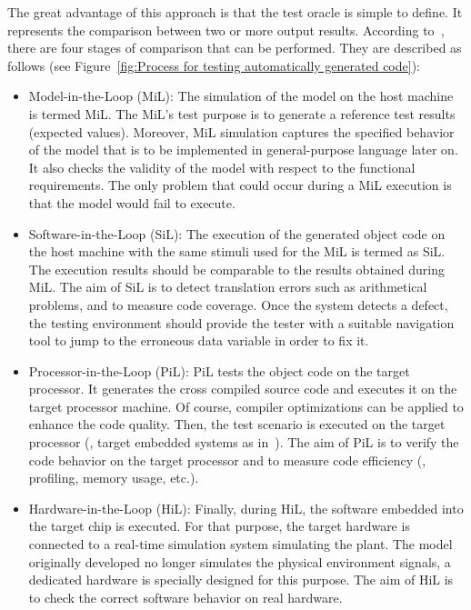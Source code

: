 The great advantage of this approach is that the test oracle is simple to define. It represents the comparison between two or more output results. According to~\cite{shokry2009model,stuermer2007systematic}, there are four stages of comparison that can be performed. They are described as follows (see Figure~\ref{fig:Process for testing automatically generated code}):
 
\begin{itemize}
	\item Model-in-the-Loop (MiL): 
	The simulation of the model on the host machine is termed MiL. 
    The MiL's test purpose is to generate a reference test results (expected values). Moreover, MiL simulation captures the specified behavior of the model that is to be implemented in general-purpose language later on. It also checks the validity of the model with respect to the functional requirements. The only problem that could occur during a MiL execution is that the model would fail to execute.

	\item Software-in-the-Loop (SiL): 
	The execution of the generated object code on the host machine with the same stimuli used for the MiL is termed as SiL. The execution results should be comparable to the results obtained during MiL. 
	The aim of SiL is to detect translation errors such as arithmetical problems, and to measure code coverage.
	Once the system detects a defect, the testing environment should provide the tester with a suitable navigation tool to jump to the erroneous data variable in order to fix it.
	
	\item Processor-in-the-Loop (PiL): 
	PiL tests the object code on the target processor. It generates the cross compiled source code and executes it on the target processor machine. Of course, compiler optimizations can be applied to enhance the code quality. Then, the test scenario is executed on the target processor (\eg, target embedded systems as in~\cite{shokry2009model}). The aim of PiL is to verify the code behavior on the target processor and to measure code efficiency (\eg, profiling, memory usage, etc.).
	
	\item Hardware-in-the-Loop (HiL): 
	Finally, during HiL, the software embedded into the target chip is executed. For that purpose, the target hardware is connected to a real-time simulation system simulating the plant. The model originally developed no longer simulates the physical environment signals, a dedicated hardware is specially designed for this purpose. The aim of HiL is to check the correct software behavior on real hardware.
\end{itemize}

